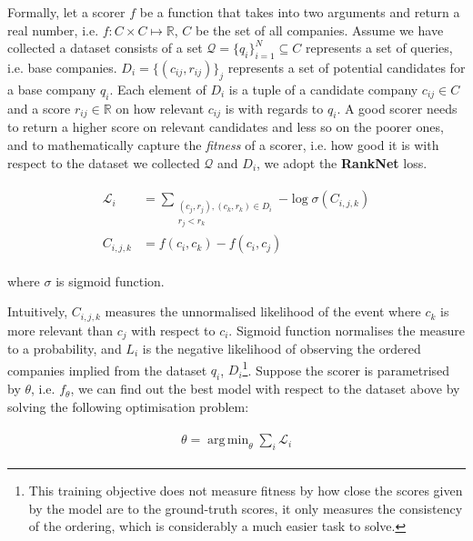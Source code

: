 \documentclass[]{article}
\DeclareMathOperator*{\argmin}{arg\,min}
\begin{document}
Formally, let a scorer $f$ be a function that takes 
into two arguments and return a real number, i.e. $f: C\times C \mapsto 
\mathbb{R}$, $C$ be the set of all companies. Assume we have collected 
a 
dataset consists of a set $\mathcal{Q}=\{q_i\}_{i=1}^N\subseteq C$ represents a 
set 
of queries, i.e. base companies. $D_i=\{(c_{ij}, r_{ij})\}_j$ represents a set 
of 
potential candidates for a base company $q_i$. Each element of $D_i$ 
is a tuple of a candidate company $c_{ij}\in C$ and a score 
$r_{ij}\in\mathbb{R}$ on 
how relevant $c_{ij}$ is with regards to $q_i$. A good scorer needs to return a 
higher score on relevant candidates and less so on the poorer ones, and to 
mathematically capture the \textit{fitness} of a scorer, i.e. how good it is 
with respect to the dataset we collected $\mathcal{Q}$ and $D_i$, we adopt the 
\textbf{RankNet} \cite{burges2005learning} loss. 

\begin{align}
\begin{split}
    \mathcal{L}_i &= \sum_{\substack{(c_j, r_j), (c_k, r_k)\in D_i \\ r_j < 
    r_k}}{-\log\sigma(C_{i, j, k})} \\
    C_{i, j, k} &= f(c_i, c_k) - f(c_i, c_j)
    \label{eq:loss}
\end{split}
\end{align}

where $\sigma$ is sigmoid function.

Intuitively, $C_{i, j, k}$ measures the unnormalised likelihood of the event 
where $c_k$ is more relevant than $c_j$ with respect to $c_i$. Sigmoid function 
normalises the measure to a probability, and $L_i$ is the negative likelihood 
of observing the ordered companies implied from the dataset $q_i$, 
$D_i$\footnote{This 
training objective does not measure fitness by how 
close the scores given by the model are to the ground-truth scores, it 
only measures the consistency of the ordering, which is considerably a much 
easier task to solve.}. Suppose the scorer is parametrised by $\theta$, i.e. 
$f_\theta$, we can find out the best model with respect to the dataset above by 
solving the following optimisation problem:

\begin{align}
\begin{split}
\theta = \argmin_\theta{\sum_i \mathcal{L}_i}
\label{eq:optimisation}
\end{split}
\end{align}
\end{document}
